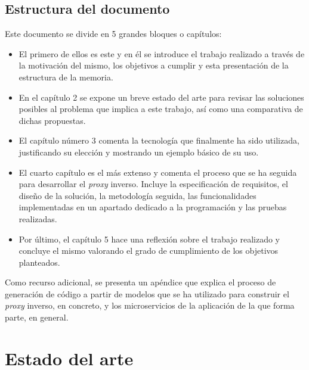 \documentclass[11pt,spanish,listoffigures]{tfgetsinf}
\begin{document}

	\section{Estructura del documento}

Este documento se divide en 5 grandes bloques o capítulos:

\begin{itemize}

	\item El primero de ellos es este y en él se introduce el trabajo realizado a través de la motivación del mismo, los objetivos a cumplir y esta presentación de la estructura de la memoria.

	\item En el capítulo 2 se expone un breve estado del arte para revisar las soluciones posibles al problema que implica a este trabajo, así como una comparativa de dichas propuestas.

	\item El capítulo número 3 comenta la tecnología que finalmente ha sido utilizada, justificando su elección y mostrando un ejemplo básico de su uso.

	\item El cuarto capítulo es el más extenso y comenta el proceso que se ha seguida para desarrollar el \emph{proxy} inverso. Incluye la especificación de requisitos, el diseño de la solución, la metodología seguida, las funcionalidades implementadas en un apartado dedicado a la programación y las pruebas realizadas.

	\item Por último, el capítulo 5 hace una reflexión sobre el trabajo realizado y concluye el mismo valorando el grado de cumplimiento de los objetivos planteados.

\end{itemize}

Como recurso adicional, se presenta un apéndice que explica el proceso de generación de código a partir de modelos que se ha utilizado para construir el \emph{proxy} inverso, en concreto, y los microservicios de la aplicación de la que forma parte, en general.


\chapter{Estado del arte}
\end{document}
